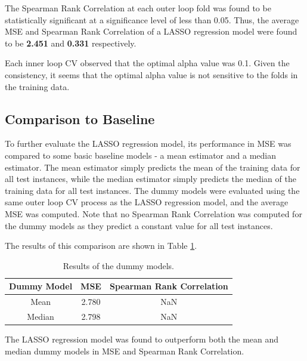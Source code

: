 \documentclass[12pt]{article}
\begin{document}
The Spearman Rank Correlation at each outer loop fold was found to be statistically significant at a significance level of less than 0.05. Thus, the average MSE and Spearman Rank Correlation of a LASSO regression model were found to be \textbf{2.451} and \textbf{0.331} respectively.

Each inner loop CV observed that the optimal alpha value was 0.1. Given the consistency, it seems that the optimal alpha value is not sensitive to the folds in the training data. 

\subsection{Comparison to Baseline}
To further evaluate the LASSO regression model, its performance in MSE was compared to some basic baseline models - a mean estimator and a median estimator. The mean estimator simply predicts the mean of the training data for all test instances, while the median estimator simply predicts the median of the training data for all test instances. The dummy models were evaluated using the same outer loop CV process as the LASSO regression model, and the average MSE was computed. Note that no Spearman Rank Correlation was computed for the dummy models as they predict a constant value for all test instances.

The results of this comparison are shown in Table \ref{tab:regression_baseline}.

\begin{table}[H]
    \centering
    \begin{tabular}{|c|c|c|}
        \hline
        Dummy Model & MSE & Spearman Rank Correlation \\
        \hline
        Mean & 2.780 & NaN \\
        Median & 2.798 & NaN \\
        \hline
    \end{tabular}
    \caption{Results of the dummy models.}
    \label{tab:regression_baseline}
\end{table}

\vspace{-0.5cm}

The LASSO regression model was found to outperform both the mean and median dummy models in MSE and Spearman Rank Correlation. 

\newpage



\end{document}
